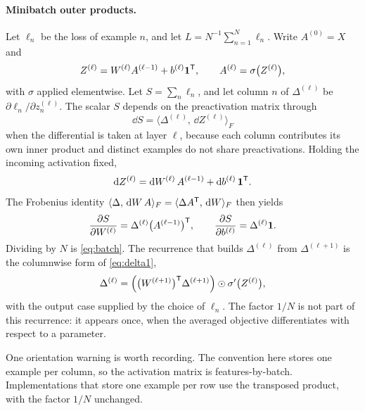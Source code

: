 
\paragraph{Minibatch outer products.}
Let \(\ell_n\) be the loss of example \(n\), and let \(L = N^{-1}\sum_{n=1}^N \ell_n\). Write \(A^{(0)} = X\) and
\[
  Z^{(\ell)} = W^{(\ell)} A^{(\ell-1)} + b^{(\ell)}\mathbf{1}^{\mathsf{T}},
  \qquad
  A^{(\ell)} = \sigma\bigl(Z^{(\ell)}\bigr),
\]
with \(\sigma\) applied elementwise. Let \(S = \sum_n \ell_n\), and let column \(n\) of \(\Delta^{(\ell)}\) be \(\partial \ell_n/\partial z^{(\ell)}_n\). The scalar \(S\) depends on the preactivation matrix through
\[
  \dd S = \bigl\langle \Delta^{(\ell)},\, \dd Z^{(\ell)}\bigr\rangle_F
\]
when the differential is taken at layer \(\ell\), because each column contributes its own inner product and distinct examples do not share preactivations. Holding the incoming activation fixed,
\[
  \mathrm{d} Z^{(\ell)} = \mathrm{d} W^{(\ell)}\, A^{(\ell-1)} + \mathrm{d} b^{(\ell)}\,\mathbf{1}^{\mathsf{T}}.
\]
The Frobenius identity \(\langle \Delta,\, \mathrm{d} W\, A\rangle_F = \langle \Delta A^{\mathsf{T}},\, \mathrm{d} W\rangle_F\) then yields
\[
  \frac{\partial S}{\partial W^{(\ell)}} = \Delta^{(\ell)}\bigl(A^{(\ell-1)}\bigr)^{\mathsf{T}},
  \qquad
  \frac{\partial S}{\partial b^{(\ell)}} = \Delta^{(\ell)}\mathbf{1}.
\]
Dividing by \(N\) is \eqref{eq:batch}. The recurrence that builds \(\Delta^{(\ell)}\) from \(\Delta^{(\ell+1)}\) is the columnwise form of \eqref{eq:delta1},
\[
  \Delta^{(\ell)}
  =
  \Bigl(\bigl(W^{(\ell+1)}\bigr)^{\mathsf{T}} \Delta^{(\ell+1)}\Bigr)
  \odot \sigma'\bigl(Z^{(\ell)}\bigr),
\]
with the output case supplied by the choice of \(\ell_n\). The factor \(1/N\) is not part of this recurrence: it appears once, when the averaged objective differentiates with respect to a parameter.

One orientation warning is worth recording. The convention here stores one example per column, so the activation matrix is features-by-batch. Implementations that store one example per row use the transposed product, with the factor \(1/N\) unchanged.

